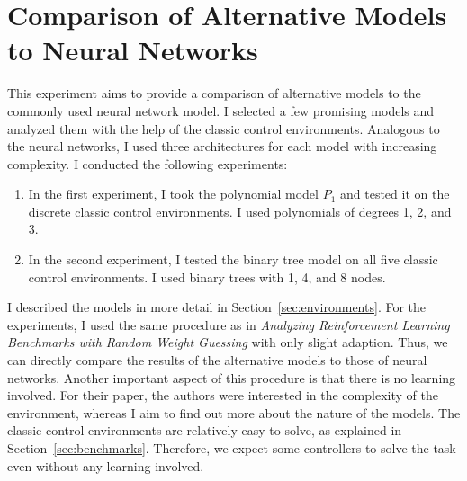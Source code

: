 \section{Comparison of Alternative Models to Neural Networks}
This experiment aims to provide a comparison of alternative models to the commonly used neural network model. I selected a few promising models and analyzed them with the help of the classic control environments. Analogous to the neural networks, I used three architectures for each model with increasing complexity. I conducted the following experiments:
\begin{enumerate}[label=(\alph*)]
  \item In the first experiment, I took the polynomial model $P_1$ and tested it on the discrete classic control environments. I used polynomials of degrees 1, 2, and 3.
  \item In the second experiment, I tested the binary tree model on all five classic control environments. I used binary trees with 1, 4, and 8 nodes.
\end{enumerate}
I described the models in more detail in Section~\ref{sec:environments}. For the experiments, I used the same procedure as in \emph{Analyzing Reinforcement Learning Benchmarks with Random Weight Guessing} with only slight adaption. Thus, we can directly compare the results of the alternative models to those of neural networks. Another important aspect of this procedure is that there is no learning involved. For their paper, the authors were interested in the complexity of the environment, whereas I aim to find out more about the nature of the models. The classic control environments are relatively easy to solve, as explained in Section~\ref{sec:benchmarks}. Therefore, we expect some controllers to solve the task even without any learning involved.

